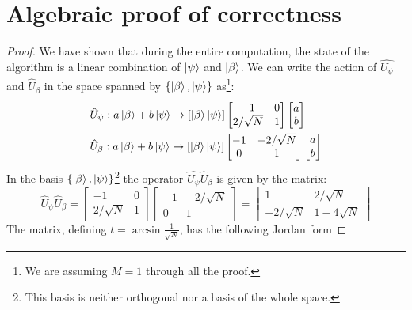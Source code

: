 \section{Algebraic proof of correctness}
\begin{proof}
We have shown that during the entire computation, the state of the algorithm is a linear combination of $\ket{\psi}$ and $\ket{\beta}$. We can write the action of $\hat{U_\psi}$ and $\hat{U}_\beta$ in the space spanned by $\{\ket{\beta}, \ket{\psi}\}$ as\footnote{We are assuming $M=1$ through all the proof.}:
\begin{align*}
    &\hat{U}_\psi : a\ket{\beta} + b\ket{\psi} \rightarrow [\ket{\beta}\ket{\psi}] \begin{bmatrix}
    -1 & 0 \\
    2/\sqrt{N} & 1
    \end{bmatrix} 
    \begin{bmatrix}
    a \\
    b
    \end{bmatrix} \\
    &\hat{U}_\beta : a\ket{\beta} + b\ket{\psi} \rightarrow [\ket{\beta}\ket{\psi}] \begin{bmatrix}
    -1 & -2/\sqrt{N} \\
    0 & 1
    \end{bmatrix} 
    \begin{bmatrix}
    a \\
    b
    \end{bmatrix} 
\end{align*}
In the basis $\{\ket{\beta}, \ket{\psi}\}$\footnote{This basis is neither orthogonal nor a basis of the whole space.} the operator $\hat{U_\psi}\hat{U}_\beta$ is given by the matrix:
\begin{equation*}
    \hat{U}_\psi\hat{U}_\beta = \begin{bmatrix}
    -1 & 0 \\
    2/\sqrt{N} & 1
    \end{bmatrix} 
    \begin{bmatrix}
    -1 & -2/\sqrt{N} \\
    0 & 1
    \end{bmatrix}  =
    \begin{bmatrix}
    1 & 2/\sqrt{N} \\
    -2/\sqrt{N} & 1-4\sqrt{N}
    \end{bmatrix} 
\end{equation*}
The matrix, defining $t=\arcsin{\frac{1}{\sqrt{N}}}$, has the following Jordan form

\end{proof}
